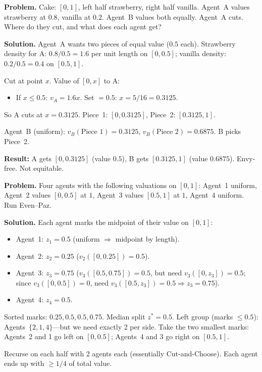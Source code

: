 \separator

\begin{exbox}
\textbf{Problem.} Cake: $[0, 1]$, left half strawberry, right half vanilla. Agent~A values strawberry at $0.8$, vanilla at $0.2$. Agent~B values both equally. Agent~A cuts. Where do they cut, and what does each agent get?

\textbf{Solution.} Agent~A wants two pieces of equal value ($0.5$ each). Strawberry density for A: $0.8/0.5 = 1.6$ per unit length on $[0, 0.5]$; vanilla density: $0.2/0.5 = 0.4$ on $[0.5, 1]$.

Cut at point $x$. Value of $[0, x]$ to A:
\begin{itemize}
  \item If $x \le 0.5$: $v_A = 1.6x$. Set $= 0.5$: $x = 5/16 = 0.3125$.
\end{itemize}
So A cuts at $x = 0.3125$. Piece~1: $[0, 0.3125]$, Piece~2: $[0.3125, 1]$.

Agent~B (uniform): $v_B(\text{Piece 1}) = 0.3125$, $v_B(\text{Piece 2}) = 0.6875$. B picks Piece~2.

\textbf{Result:} A gets $[0, 0.3125]$ (value $0.5$), B gets $[0.3125, 1]$ (value $0.6875$). Envy-free. Not equitable.
\end{exbox}

\separator

\begin{exbox}
\textbf{Problem.} Four agents with the following valuations on $[0,1]$: Agent~1 uniform, Agent~2 values $[0, 0.5]$ at $1$, Agent~3 values $[0.5, 1]$ at $1$, Agent~4 uniform. Run Even--Paz.

\textbf{Solution.} Each agent marks the midpoint of their value on $[0, 1]$:
\begin{itemize}
  \item Agent~1: $z_1 = 0.5$ (uniform $\Rightarrow$ midpoint by length).
  \item Agent~2: $z_2 = 0.25$ ($v_2([0, 0.25]) = 0.5$).
  \item Agent~3: $z_3 = 0.75$ ($v_3([0.5, 0.75]) = 0.5$, but need $v_3([0, z_3]) = 0.5$; since $v_3([0, 0.5]) = 0$, need $v_3([0.5, z_3]) = 0.5 \Rightarrow z_3 = 0.75$).
  \item Agent~4: $z_4 = 0.5$.
\end{itemize}
Sorted marks: $0.25, 0.5, 0.5, 0.75$. Median split $z^* = 0.5$. Left group (marks $\le 0.5$): Agents~$\{2, 1, 4\}$---but we need exactly 2 per side. Take the two smallest marks: Agents~2 and 1 go left on $[0, 0.5]$; Agents~4 and 3 go right on $[0.5, 1]$.

Recurse on each half with 2 agents each (essentially Cut-and-Choose). Each agent ends up with $\ge 1/4$ of total value.
\end{exbox}

